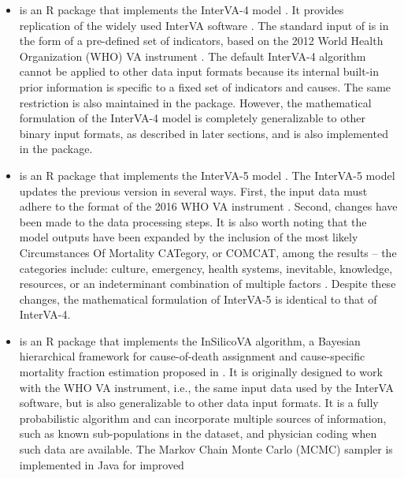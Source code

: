 \begin{itemize}
\item
   \citep{li2014interva4, interVA4} is an R package
  that implements the InterVA-4 model \citep{byass2012strengthening}. It
  provides replication of the widely used InterVA software
  \citep{2015interVA}. The standard input of  is in
  the form of a pre-defined set of indicators, based on the 2012 World
  Health Organization (WHO) VA instrument \citep{world2012verbal}. The
  default InterVA-4 algorithm cannot be applied to other data input
  formats because its internal built-in prior information is specific to
  a fixed set of indicators and causes. The same restriction is also
  maintained in the  package. However, the
  mathematical formulation of the InterVA-4 model is completely
  generalizable to other binary input formats, as described in later
  sections, and is also implemented in the  package.
\item
   \citep{interVA5} is an R package that implements
  the InterVA-5 model \citep{byass2019integrated}. The InterVA-5 model
  updates the previous version in several ways. First, the input data
  must adhere to the format of the 2016 WHO VA instrument
  \citep{dambruoso2017}. Second, changes have been made to the data
  processing steps. It is also worth noting that the model outputs have
  been expanded by the inclusion of the most likely Circumstances Of
  Mortality CATegory, or COMCAT, among the results -- the categories
  include: culture, emergency, health systems, inevitable, knowledge,
  resources, or an indeterminant combination of multiple factors
  \citep[for more details, see][]{dambruoso2017}. Despite these changes,
  the mathematical formulation of InterVA-5 is identical to that of
  InterVA-4.
\item
   \citep{insilicovapkg} is an R package that
  implements the InSilicoVA algorithm, a Bayesian hierarchical framework
  for cause-of-death assignment and cause-specific mortality fraction
  estimation proposed in \citet{insilico}. It is originally designed to
  work with the WHO VA instrument, i.e., the same input data used by the
  InterVA software, but is also generalizable to other data input
  formats. It is a fully probabilistic algorithm and can incorporate
  multiple sources of information, such as known sub-populations in the
  dataset, and physician coding when such data are available. The Markov
  Chain Monte Carlo (MCMC) sampler is implemented in Java for improved

\end{itemize}
